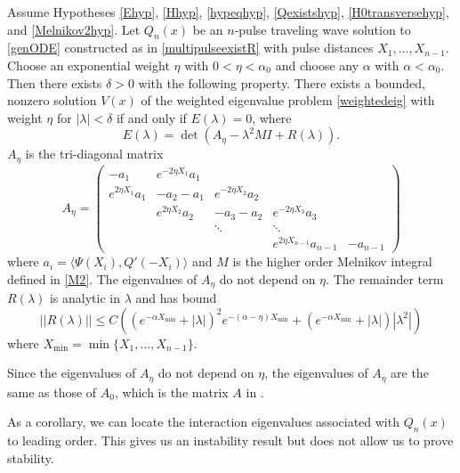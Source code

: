 \documentclass[thesis.tex]{subfiles}
\begin{document}
\begin{theorem}\label{expwtstabtheorem}
Assume Hypotheses \ref{Ehyp}, \ref{Hhyp}, \ref{hypeqhyp}, \ref{Qexistshyp}, \ref{H0transversehyp}, and \ref{Melnikov2hyp}. Let $Q_n(x)$ be an $n$-pulse traveling wave solution to \cref{genODE} constructed as in \cref{multipulseexistR} with pulse distances $X_1, \dots, X_{n-1}$. Choose an exponential weight $\eta$ with $0 < \eta < \alpha_0$ and choose any $\alpha$  with $\alpha < \alpha_0$. Then there exists $\delta > 0$ with the following property. There exists a bounded, nonzero solution $V(x)$ of the weighted eigenvalue problem \eqref{weightedeig} with weight $\eta$ for $|\lambda| < \delta$ if and only if $E(\lambda) = 0$, where
\[
E(\lambda) = \det \left( A_\eta - \lambda^2 M I + R(\lambda) \right).
\]
$A_\eta$ is the tri-diagonal matrix
\begin{equation}\label{Aeta}
A_\eta = \begin{pmatrix}
-a_1 & e^{-2 \eta X_1} a_1 \\
e^{2 \eta X_1} a_1 & -a_2 - a_1 & e^{-2 \eta X_2} a_2 \\
& e^{2 \eta X_2} a_2 & -a_3 - a_2 & e^{-2 \eta X_3} a_3 \\
&& \ddots & \ddots \\
& & & e^{2 \eta X_{n-1}} a_{n-1} & -a_{n-1} 
\end{pmatrix}
\end{equation}
where $a_i = \langle \Psi(X_i), Q'(-X_i) \rangle$ and $M$ is the higher order Melnikov integral defined in \cref{M2}. The eigenvalues of $A_\eta$ do not depend on $\eta$. The remainder term $R(\lambda)$ is analytic in $\lambda$ and has bound
\begin{equation*}
||R(\lambda)|| \leq C 
\left( (e^{-\alpha X_{\min}} + |\lambda|)^2 e^{-(\alpha - \eta)X_{\min}}  
+ (e^{-\alpha X_{\min}} + |\lambda| )|\lambda^2| \right)
\end{equation*}
where $X_{\min} = \min\{X_1, \dots, X_{n-1}\}$.
\end{theorem}

\begin{remark}
Since the eigenvalues of $A_\eta$ do not depend on $\eta$, the eigenvalues of $A_\eta$ are the same as those of $A_0$, which is the matrix $A$ in \cite[(2.8)]{Sandstede1998}.
\end{remark}

As a corollary, we can locate the interaction eigenvalues associated with $Q_n(x)$ to leading order. This gives us an instability result but does not allow us to prove stability.
\end{document}
